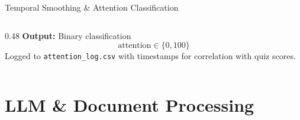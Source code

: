 \documentclass[aspectratio=169,10pt]{beamer}
\begin{document}
\begin{frame}{Temporal Smoothing \& Attention Classification}
\begin{columns}[T]
\begin{column}{0.48\textwidth}
\vspace{6pt}
\textbf{Output:} Binary classification
\begin{equation*}
\text{attention} \in \{0, 100\}
\end{equation*}
Logged to \texttt{attention\_log.csv} with timestamps for correlation with quiz scores.
\end{column}
\end{columns}
\end{frame}

\section{LLM \& Document Processing}
\end{document}
